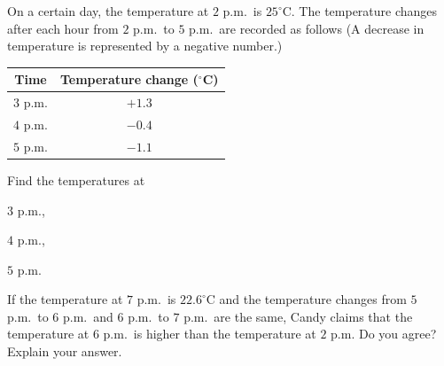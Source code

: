  On a certain day, the temperature at $2$ p.m.\ is $25^{\circ}$C. The temperature changes after each hour from $2$ p.m.\ to $5$ p.m.\ are recorded as follows (A decrease in temperature is represented by a negative number.)

\begin{center}
\small
\begin{tabular}{|c|c|}
\hline
\textbf{Time} & \textbf{Temperature change ($^{\circ}$C)} \\
\hline
$3$ p.m. & $+1.3$ \\
\hline
$4$ p.m. & $-0.4$ \\
\hline
$5$ p.m. & $-1.1$ \\
\hline
\end{tabular}
\end{center}

\begin{subparts}
  \item Find the temperatures at
  \begin{subpartsii}[1]
    \item $3$ p.m.,
    \item $4$ p.m.,
    \item $5$ p.m.
  \end{subpartsii}

  \item If the temperature at $7$ p.m.\ is $22.6^{\circ}$C and the temperature changes from $5$ p.m.\ to $6$ p.m.\ and $6$ p.m.\ to $7$ p.m.\ are the same, Candy claims that the temperature at $6$ p.m.\ is higher than the temperature at $2$ p.m. Do you agree? Explain your answer.
\end{subparts}

